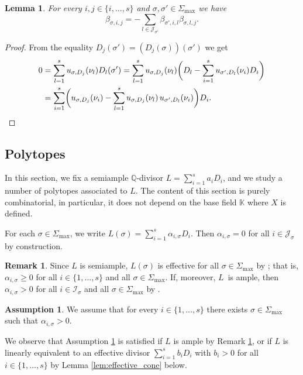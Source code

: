 \documentclass[11pt]{article}
\numberwithin{equation}{section}
\newcommand\QQ{\mathbb{Q}}
\newcommand{\KK}{\mathbb{K}}
\newcommand{\gen}[1]{\nu_{#1}}
\newcommand{\ii}[1]{\mathcal{J}_{#1}}
\newcommand{\ic}[1]{\mathcal{I}_{#1}}
\newtheorem{lemma}[theorem]{Lemma}
\theoremstyle{definition}
\newtheorem{remark}[theorem]{Remark}
\newtheorem{assumption}[theorem]{Assumption}
\numberwithin{theorem}{section}
\begin{document}
\begin{lemma}
\label{lem:relation_beta_sigma_sigma'}
For every $i,j\in\{i,\dots,s\}$ and $\sigma,\sigma'\in\Sigma_{\max}$ we have
\[
\beta_{\sigma, i,j}
=-\sum_{l\in \ii{\sigma'}}\beta_{\sigma', i, l}\beta_{\sigma, l, j}.
\]
\end{lemma}
\begin{proof}
From the equality $D_{j}(\sigma')=(D_{j}(\sigma))(\sigma')$
we get
\begin{align*}
0&= \sum_{l=1}^s u_{\sigma,D_{j}}(\gen{l})D_{l}(\sigma')
= \sum_{l=1}^s u_{\sigma,D_{j}}(\gen{l})\biggl(D_{l}-\sum_{i=1}^s u_{\sigma',D_{l}}(\gen{i})D_i\biggr)\\
&=\sum_{i=1}^s\biggl(u_{\sigma,D_{j}}(\gen{i})
- \sum_{l=1}^s u_{\sigma,D_{j}}(\gen{l})\, u_{\sigma',D_{l}}(\gen{i})\biggr)D_i.
\qedhere
\end{align*}
\end{proof}

\subsection{Polytopes}
\label{sec:polytopes_toric}

In this section, we fix a semiample $\QQ$-divisor $L=\sum_{i=1}^s a_i D_i$,
and we study a number of polytopes associated to $L$.
The content of this section is purely combinatorial,
in particular, it does not depend on the base field $\KK$ where $X$ is defined.

For each $\sigma\in\Sigma_{\max}$, we write $L(\sigma)=\sum_{i=1}^s\alpha_{i, \sigma}D_i$.
Then $\alpha_{i,\sigma}=0$ for all $i\in\ii{\sigma}$ by construction.
\begin{remark}
\label{rem:basepointfree_L(sigma)}
Since $L$ is semiample, $L(\sigma)$ is effective for all $\sigma\in\Sigma_{\max}$
by \cite[Prop.\,6.1.1]{MR2810322}; that is, $\alpha_{i,\sigma}\geq0$ for all
$i\in\{1,\dots,s\}$ and all $\sigma\in\Sigma_{\max}$.
If, moreover, $L$~is ample, then $\alpha_{i,\sigma}>0$ for all $i\in\ic{\sigma}$ and
all $\sigma\in\Sigma_{\max}$ by \cite[Th.\,6.1.14]{MR2810322}.
\end{remark}

\begin{assumption}
\label{assp:L}
We assume that for every $i\in\{1,\dots,s\}$ there exists $\sigma\in\Sigma_{\max}$
such that $\alpha_{i,\sigma}>0$.
\end{assumption}

We observe that Assumption \ref{assp:L} is satisfied
if $L$ is ample by Remark \ref{rem:basepointfree_L(sigma)},
or if $L$ is linearly equivalent to an effective divisor
$\sum_{i=1}^s b_i D_i$ with $b_i>0$ for all $i\in\{1,\dots,s\}$
by Lemma \ref{lem:effective_cone} below.
\end{document}
